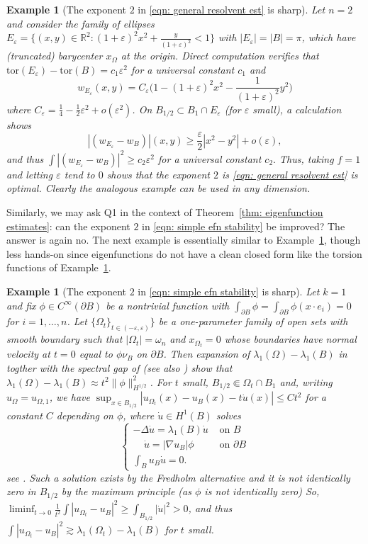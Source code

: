 \documentclass[10pt, reqno]{amsart}
\numberwithin{equation}{section}
\newtheorem{example}[theorem]{Example}
\def\R{{\mathbb R}}
\def\e{\varepsilon}
\def\W{\Omega}
\def\tor{\mathrm{tor}}
\begin{document}
\begin{example}[The exponent $2$ in \eqref{eqn: general resolvent est} is sharp] \label{Ex: 1}
{\rm Let $n=2$ and consider the family of ellipses $E_\e = \{(x,y) \in \R^2 : (1+\e)^2 x^2 + \frac{y}{(1+\e)^2} < 1 \}$ with $|E_\e | = |B|  =\pi$, which have (truncated) barycenter $x_\W$ at the origin.  Direct computation verifies  that $\tor(E_\e) - \tor(B) = c_1 \e^2$ for a universal constant $c_1$ and 
\[
w_{E_\e}(x,y) = C_\e \Big(1- (1+\e)^2 x^2 - \frac{1}{(1+\e)^2}y^2 \Big)
\]
where  $C_\e = \frac{1}{4} - \frac{1}{2}\e^2 + o(\e^2)$. On $B_{1/2} \subset B_1 \cap E_\e$ (for $\e$ small), a calculation shows
\[
|(w_{E_\e} - w_B)|(x,y) \geq \frac{\e}{2} |x^2 - y^2 | + o(\e),
\]
and thus $\int |(w_{E_\e} - w_B)|^2 \geq c_2\e^2$ for a universal constant $c_2.$ Thus, taking $f=1$ and letting $\e$ tend to $0$ shows that the exponent $2$ is \eqref{eqn: general resolvent est} is optimal. Clearly the analogous example can be used in any dimension.
}
\end{example}
Similarly, we may ask Q1 in the context of Theorem~\ref{thm: eigenfunction estimates}: can the exponent $2$ in \eqref{eqn: simple efn stability} be improved? The answer is again no. 
The next example is essentially similar to Example~\ref{Ex: 1}, though less hands-on since eigenfunctions do not have a clean closed form like the torsion functions of Example~\ref{Ex: 1}.
 
\begin{example}[The exponent $2$ in \eqref{eqn: simple efn stability} is sharp]\label{Ex: 1.5}
{\rm
Let $k=1$ and fix $\phi \in C^{\infty}(\partial B)$ be a nontrivial function with $\int_{\partial B} \phi = \int_{\partial B} \phi (x\cdot e_i)  = 0$ for $i=1,\dots, n$. Let $\{\W_t\}_{t \in (-\e,\e)}\}$ be a one-parameter family of open sets with smooth boundary such that $|\W_t| = \omega_n$ and $x_{\W_t}=0$ whose boundaries have normal velocity at $t=0$ equal to $\phi \nu_B$ on $\partial B$.
Then expansion of $\lambda_1(\W) - \lambda_1(B)$ in \cite[Theorem 1]{d02} togther with the spectral gap of \cite[Theorem 3.7]{AKN1} (see also \cite[Theorem 3.3]{BDV15}) show that $\lambda_1(\W) - \lambda_1(B) \approx t^2 \|\phi\|_{H^{1/2}}^2$. For $t$ small,  $B_{1/2} \Subset \Omega_t \cap B_1$ and, writing $u_\W = u_{\W,1}$,   we have $\sup_{x \in B_{1/2}} |u_{\Omega_t}(x) -u_{B}(x) - t \dot{u}(x)| \leq C t^2$ for a constant $C$ depending on $\phi$, where $\dot{u} \in H^1(B)$ solves 
\[
\begin{cases}
   -\Delta \dot{u} =  \lambda_1(B) \dot{u}& \text{ on } B\\
 \ \ \ \ \ \dot{u} = |\nabla u_B| \phi & \text{ on }\partial B\\
    \int_B u_B \dot{u} = 0.
\end{cases}
\]
see \cite[Section 5.7]{hp18}. Such a solution exists by the Fredholm alternative and it is not identically zero in $B_{1/2}$ by the maximum principle (as $\phi$ is not identically zero)
So, $\liminf_{t\to 0}\frac{1}{t^2} \int |u_{\W_t} - u_B|^2 \geq \int_{B_{1/2}} |\dot{u}|^2>0$, and thus $\int |u_{\W_t} - u_B|^2 \gtrsim \lambda_1(\W_t) - \lambda_1(B)$ for $t$ small.
}
    
\end{example}
\end{document}
